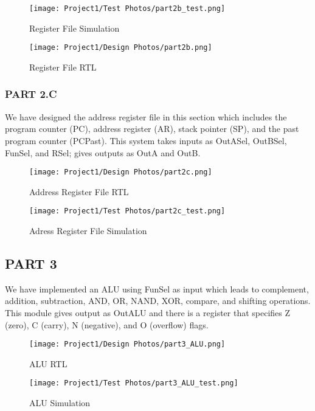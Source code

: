 \documentclass[pdftex,12pt,a4paper]{article}
\begin{document}
\begin{figure}[H]
	\centering
	\texttt{[image: Project1/Test Photos/part2b\_test.png]}	
	\caption{Register File Simulation}
	\label{figfive}
\end{figure}


\begin{figure}[H]
	\centering
	\texttt{[image: Project1/Design Photos/part2b.png]}	
	\caption{Register File RTL}
	\label{figsix}
\end{figure}



\subsubsection{PART 2.C}
We have designed the address register file in this section which includes the program counter (PC), address register (AR), stack pointer (SP), and the past program counter (PCPast). This system takes inputs as OutASel, OutBSel, FunSel, and RSel; gives outputs as OutA and OutB.

\begin{figure}[H]
	\centering
	\texttt{[image: Project1/Design Photos/part2c.png]}	
	\caption{Address Register File RTL}
	\label{fig1}
\end{figure}

\begin{figure}[H]
	\centering
	\texttt{[image: Project1/Test Photos/part2c\_test.png]}	
	\caption{Adress Register File Simulation}
	\label{figeight}
\end{figure}


\subsection{PART 3}
We have implemented an ALU using FunSel as input which leads to complement, addition, subtraction, AND, OR, NAND, XOR, compare, and shifting operations. This module gives output as OutALU and there is a register that specifies Z (zero), C (carry), N (negative), and O (overflow) flags.

\begin{figure}[H]
	\centering
	\texttt{[image: Project1/Design Photos/part3\_ALU.png]}	
	\caption{ALU RTL}
	\label{fignine}
\end{figure}

\begin{figure}[H]
	\centering
	\texttt{[image: Project1/Test Photos/part3\_ALU\_test.png]}	
	\caption{ALU Simulation}
	\label{figten}
\end{figure}
\end{document}

